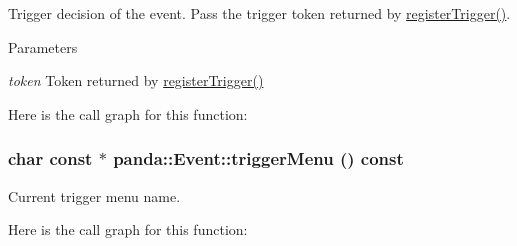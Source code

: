 Trigger decision of the event. Pass the trigger token returned by \hyperlink{classpanda_1_1Event_aa677c9bdbd32efd3652269efbfa9b659}{registerTrigger()}.


\begin{DoxyParams}{Parameters}
\item[{\em token}]Token returned by \hyperlink{classpanda_1_1Event_aa677c9bdbd32efd3652269efbfa9b659}{registerTrigger()} \end{DoxyParams}


Here is the call graph for this function:\hypertarget{classpanda_1_1Event_ad091ad7fd273c9d22469cea19e97d136}{
\subsubsection[{triggerMenu}]{\setlength{\rightskip}{0pt plus 5cm}char const $\ast$ panda::Event::triggerMenu () const}}
\label{classpanda_1_1Event_ad091ad7fd273c9d22469cea19e97d136}


Current trigger menu name. 

Here is the call graph for this function:

